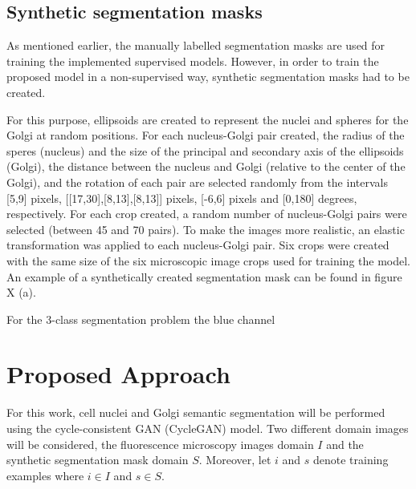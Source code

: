 \subsection{Synthetic segmentation masks}
\label{subsection:synthetic_masks}

As mentioned earlier, the manually labelled segmentation masks are used for training the implemented supervised models. However, in order to train the proposed model in a non-supervised way, synthetic segmentation masks had to be created. 

For this purpose, ellipsoids are created to represent the nuclei and spheres for the Golgi at random positions. For each nucleus-Golgi pair created, the radius of the speres (nucleus) and the size of the principal and secondary axis of the ellipsoids (Golgi), the distance between the nucleus and Golgi (relative to the center of the Golgi), and the rotation of each pair are selected randomly from the intervals [5,9] pixels, [[17,30],[8,13],[8,13]] pixels, [-6,6] pixels and [0,180] degrees, respectively. For each crop created, a random number of nucleus-Golgi pairs were selected (between 45 and 70 pairs). To make the images more realistic, an elastic transformation was applied to each nucleus-Golgi pair. Six crops were created with the same size of the six microscopic image crops used for training the model. An example of a synthetically created segmentation mask can be found in figure X (a).

For the 3-class segmentation problem the blue channel 



\section{Proposed Approach}
\label{section:proposed}

For this work, cell nuclei and Golgi semantic segmentation will be performed using the cycle-consistent GAN (CycleGAN) model. Two different domain images will be considered, the fluorescence microscopy images domain $I$ and the synthetic segmentation mask domain $S$. Moreover, let $i$ and $s$ denote training examples where $i \in I$ and $s \in S$.


